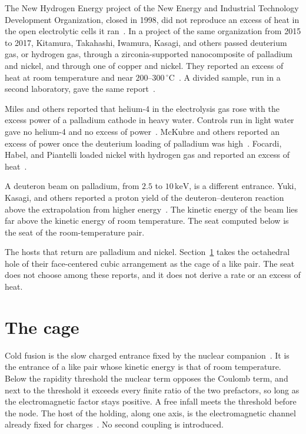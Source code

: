 \documentclass[a4paper]{article}
\begin{document}
The New Hydrogen Energy project of the New Energy and Industrial Technology Development Organization, closed in 1998, did not reproduce an excess of heat in the open electrolytic cells it ran~\cite{nhe1998}. In a project of the same organization from 2015 to 2017, Kitamura, Takahashi, Iwamura, Kasagi, and others passed deuterium gas, or hydrogen gas, through a zirconia-supported nanocomposite of palladium and nickel, and through one of copper and nickel. They reported an excess of heat at room temperature and near \(200\)--\(300\,^{\circ}\mathrm{C}\)~\cite{kitamura2017}. A divided sample, run in a second laboratory, gave the same report~\cite{iwamura2017}.

Miles and others reported that helium-4 in the electrolysis gas rose with the excess power of a palladium cathode in heavy water. Controls run in light water gave no helium-4 and no excess of power~\cite{miles1993}. McKubre and others reported an excess of power once the deuterium loading of palladium was high~\cite{mckubre1994}. Focardi, Habel, and Piantelli loaded nickel with hydrogen gas and reported an excess of heat~\cite{focardi1994}.

A deuteron beam on palladium, from \(2.5\) to \(10\,\mathrm{keV}\), is a different entrance. Yuki, Kasagi, and others reported a proton yield of the deuteron--deuteron reaction above the extrapolation from higher energy~\cite{yuki1998}. The kinetic energy of the beam lies far above the kinetic energy of room temperature. The seat computed below is the seat of the room-temperature pair.

The hosts that return are palladium and nickel. Section~\ref{sec:cage} takes the octahedral hole of their face-centered cubic arrangement as the cage of a like pair. The seat does not choose among these reports, and it does not derive a rate or an excess of heat.

\section{The cage}
\label{sec:cage}

Cold fusion is the slow charged entrance fixed by the nuclear companion~\cite{dst-strong}. It is the entrance of a like pair whose kinetic energy is that of room temperature. Below the rapidity threshold the nuclear term opposes the Coulomb term, and next to the threshold it exceeds every finite ratio of the two prefactors, so long as the electromagnetic factor stays positive. A free infall meets the threshold before the node. The host of the holding, along one axis, is the electromagnetic channel already fixed for charges~\cite{dst-shell}. No second coupling is introduced.
\end{document}
